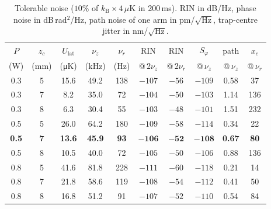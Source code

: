 \documentclass[11pt,a4paper]{article}
\newcommand{\kB}{k_\mathrm{B}}
\newcommand{\Ulat}{U_\mathrm{lat}}
\begin{document}
\begin{table}[h]
\centering
\caption{Tolerable noise ($10\%$ of $\kB\times4\,\mu$K in 200\,ms). RIN in dB/Hz, phase noise in dB\,rad$^2$/Hz, path noise of one arm in pm/$\sqrt{\mathrm{Hz}}$, trap-centre jitter in nm/$\sqrt{\mathrm{Hz}}$.}
\label{tab:noise_tol}
\small
\setlength{\tabcolsep}{4pt}
\begin{tabular}{@{}cccccccccc@{}}
\toprule
$P$ & $z_c$ & $\Ulat$ & $\nu_z$ & $\nu_r$ & RIN & RIN & $S_\varphi$ & path & $x_c$ \\
(W) & (mm) & (\si{\micro K}) & (kHz) & (Hz) & @\,$2\nu_z$ & @\,$2\nu_r$ & @\,$\nu_z$ & @\,$\nu_z$ & @\,$\nu_r$ \\
\midrule
0.3 & 5 & 15.6 & 49.2 & 138 & $-107$ & $-56$ & $-109$ & 0.58 & 37 \\
0.3 & 7 & 8.2 & 35.0 & 72 & $-104$ & $-50$ & $-103$ & 1.14 & 136 \\
0.3 & 8 & 6.3 & 30.4 & 55 & $-103$ & $-48$ & $-101$ & 1.51 & 232 \\
0.5 & 5 & 26.0 & 64.2 & 180 & $-109$ & $-58$ & $-114$ & 0.34 & 22 \\
\textbf{0.5} & \textbf{7} & \textbf{13.6} & \textbf{45.9} & \textbf{93} & $\mathbf{-106}$ & $\mathbf{-52}$ & $\mathbf{-108}$ & \textbf{0.67} & \textbf{80} \\
0.5 & 8 & 10.5 & 40.0 & 72 & $-105$ & $-50$ & $-106$ & 0.88 & 136 \\
0.8 & 5 & 41.6 & 81.8 & 228 & $-111$ & $-60$ & $-118$ & 0.21 & 14 \\
0.8 & 7 & 21.8 & 58.6 & 119 & $-108$ & $-54$ & $-112$ & 0.41 & 50 \\
0.8 & 8 & 16.8 & 51.2 & 91 & $-107$ & $-52$ & $-110$ & 0.54 & 84 \\
\bottomrule
\end{tabular}
\end{table}
\end{document}
